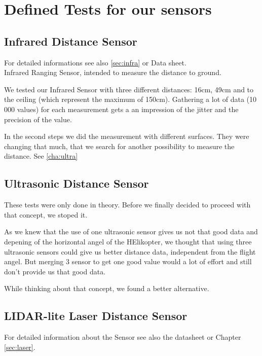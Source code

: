 
\chapter{Defined Tests for our sensors}
\label{sec:tests}


\section{Infrared Distance Sensor}
\label{sec:TestInfra}

For detailed informations see also \ref{sec:infra} or Data sheet.\\

Infrared Ranging Sensor, intended to measure the distance to ground.

We tested our Infrared Sensor with three different distances: 16cm, 49cm and to the ceiling (which represent the maximum of 150cm). Gathering a lot of data (10 000 values) for each measurement gets a an impression of the jitter and the precision of the value.

In the second steps we did the measurement with different surfaces. They were changing that much, that we search for another possibility to measure the distance. See \ref{cha:ultra}


\section{Ultrasonic Distance Sensor}
\label{sec:TestUltrasonic}

These tests were only done in theory. Before we finally decided to proceed with that concept, we stoped it.

As we knew that the use of one ultrasonic sensor gives us not that good data and depening of the horizontal angel of the HElikopter, we thought that using three ultrasonic sensors could give us better distance data, independent from the flight angel. But merging 3 sensor to get one good value would a lot of effort and still don't provide us that good data.

While thinking about that concept, we found a better alternative.



\section{LIDAR-lite Laser Distance Sensor}
\label{sec:TestLaser}

For detailed information about the Sensor see also the datasheet or Chapter \ref{sec:laser}.\\

